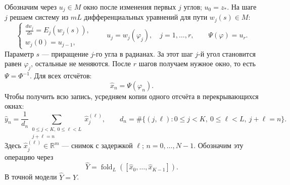 \documentclass[11pt,a4paper]{article}
\begin{document}
Обозначим через $u_j\in M$ окно после изменения первых $j$ углов;
$u_0=z_*$. На шаге $j$ решаем систему из $mL$ дифференциальных уравнений
для пути $w_j(s)\in M$:
\begin{equation}
\begin{cases}
\displaystyle\frac{dw_j}{ds}=E_j(w_j(s)),\\[3pt]
w_j(0)=u_{j-1},
\end{cases}
\qquad
u_j=w_j(\varphi_j),\quad j=1,\ldots,r,
\qquad \Psi(\varphi)=u_r.
\label{eq:phase-decoder}
\end{equation}
Параметр $s$ --- приращение $j$-го угла в радианах.
За этот шаг $j$-й угол становится равен $\varphi_j$, остальные не меняются.
После $r$ шагов получаем нужное окно, то есть $\Psi=\Phi^{-1}$.
Для всех отсчётов:
\begin{equation}
\widehat x_n=\Psi(\varphi_n).
\label{eq:measurement-decoder}
\end{equation}
Чтобы получить всю запись, усредняем копии одного отсчёта в перекрывающихся окнах:
$$
\widehat y_n=\frac{1}{d_n}
\sum_{\substack{0\le j<K,\ 0\le\ell<L\\j+\ell=n}}\widehat x_j^{(\ell)},\qquad
 d_n=\#\{(j,\ell):0\le j<K,\ 0\le\ell<L,\ j+\ell=n\}.
$$
Здесь $\widehat x_j^{(\ell)}\in\mathbb R^m$ --- снимок с задержкой $\ell$;
$n=0,\ldots,N-1$. Обозначим эту операцию через
\begin{equation}
\widehat Y=\operatorname{fold}_L([\widehat x_0,\ldots,\widehat x_{K-1}]).
\label{eq:folding}
\end{equation}
В точной модели $\widehat Y=Y$.
\end{document}
